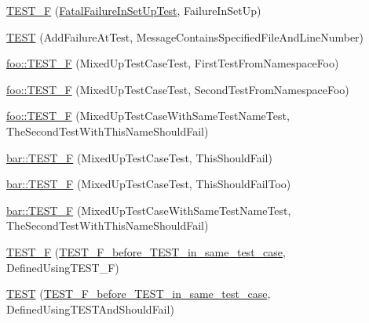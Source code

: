 \begin{DoxyCompactItemize}
\mbox{\hyperlink{_obj__test_2lib_2googletest-release-1_88_81_2googletest_2test_2googletest-output-test___8cc_a52057afc95d69adbae1fbe0ef92b29d7}{T\+E\+S\+T\+\_\+F}} (\mbox{\hyperlink{class_fatal_failure_in_set_up_test}{Fatal\+Failure\+In\+Set\+Up\+Test}}, Failure\+In\+Set\+Up)
\item 
\mbox{\hyperlink{_obj__test_2lib_2googletest-release-1_88_81_2googletest_2test_2googletest-output-test___8cc_a62631ea26f8f98f3f19dc03f950dc197}{T\+E\+ST}} (Add\+Failure\+At\+Test, Message\+Contains\+Specified\+File\+And\+Line\+Number)
\item 
\mbox{\hyperlink{namespacefoo_a0d50eecc97df56ae625078848ba9c98a}{foo\+::\+T\+E\+S\+T\+\_\+F}} (Mixed\+Up\+Test\+Case\+Test, First\+Test\+From\+Namespace\+Foo)
\item 
\mbox{\hyperlink{namespacefoo_a7911fd62b6ae405016caed779b2f95dc}{foo\+::\+T\+E\+S\+T\+\_\+F}} (Mixed\+Up\+Test\+Case\+Test, Second\+Test\+From\+Namespace\+Foo)
\item 
\mbox{\hyperlink{namespacefoo_a2bc2a2547ff38da0ecf68676e75583cd}{foo\+::\+T\+E\+S\+T\+\_\+F}} (Mixed\+Up\+Test\+Case\+With\+Same\+Test\+Name\+Test, The\+Second\+Test\+With\+This\+Name\+Should\+Fail)
\item 
\mbox{\hyperlink{namespacebar_a0e342ef00f400f593f866279689c55ac}{bar\+::\+T\+E\+S\+T\+\_\+F}} (Mixed\+Up\+Test\+Case\+Test, This\+Should\+Fail)
\item 
\mbox{\hyperlink{namespacebar_adf88eb6e7ed65a5bd641aa80b237ea2c}{bar\+::\+T\+E\+S\+T\+\_\+F}} (Mixed\+Up\+Test\+Case\+Test, This\+Should\+Fail\+Too)
\item 
\mbox{\hyperlink{namespacebar_a600f9a0c34015b598089fb6b69adc63a}{bar\+::\+T\+E\+S\+T\+\_\+F}} (Mixed\+Up\+Test\+Case\+With\+Same\+Test\+Name\+Test, The\+Second\+Test\+With\+This\+Name\+Should\+Fail)
\item 
\mbox{\hyperlink{_obj__test_2lib_2googletest-release-1_88_81_2googletest_2test_2googletest-output-test___8cc_ae71a8d4934e768af615b9b09418f15c3}{T\+E\+S\+T\+\_\+F}} (\mbox{\hyperlink{class_t_e_s_t___f__before___t_e_s_t__in__same__test__case}{T\+E\+S\+T\+\_\+\+F\+\_\+before\+\_\+\+T\+E\+S\+T\+\_\+in\+\_\+same\+\_\+test\+\_\+case}}, Defined\+Using\+T\+E\+S\+T\+\_\+F)
\item 
\mbox{\hyperlink{_obj__test_2lib_2googletest-release-1_88_81_2googletest_2test_2googletest-output-test___8cc_a4b026b84b5a6dcbfa586f406e7c6b79c}{T\+E\+ST}} (\mbox{\hyperlink{class_t_e_s_t___f__before___t_e_s_t__in__same__test__case}{T\+E\+S\+T\+\_\+\+F\+\_\+before\+\_\+\+T\+E\+S\+T\+\_\+in\+\_\+same\+\_\+test\+\_\+case}}, Defined\+Using\+T\+E\+S\+T\+And\+Should\+Fail)

\end{DoxyCompactItemize}
